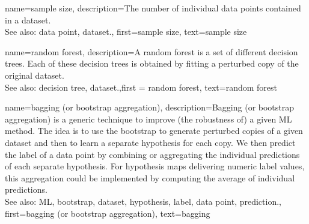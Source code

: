 	
{name={sample size},
  description={The number of individual data points 
		contained in a dataset.
				\\
		See also: data point, dataset.},
  first={sample size},
  text={sample size}
}



{name={random forest},
	description={A random forest is a set of different decision trees. 
		Each of these decision trees is obtained by fitting a perturbed copy of 
		the original dataset.
				\\
		See also: decision tree, dataset.},first = {random forest}, text={random forest}
}

{name={bagging (or bootstrap aggregation)},
description={Bagging (or bootstrap aggregation) 
		is a generic technique to improve (the robustness of) a given ML method. 
		The idea is to use the bootstrap to generate perturbed copies of a given dataset 
		and then to learn a separate hypothesis for each copy. We then predict the 
		label of a data point by combining or aggregating the individual predictions 
		of each separate hypothesis. For hypothesis maps delivering numeric label 
		values, this aggregation could be implemented by computing the average of individual 
		predictions.
				\\
		See also: ML, bootstrap, dataset, hypothesis, label, data point, prediction.},
		first={bagging (or bootstrap aggregation)},
		text={bagging}}

